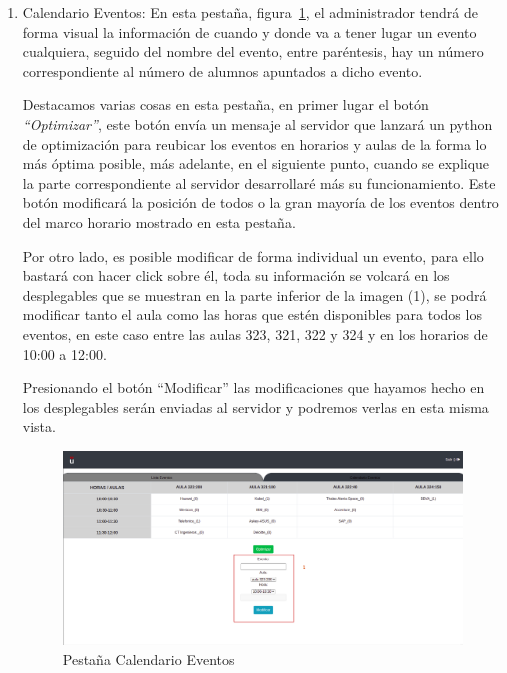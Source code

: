 \documentclass[a4paper, 12pt]{book}
\begin{document}
\begin{enumerate}
	\item Calendario Eventos: En esta pestaña, figura~\ref{fig:adminCalendario}, el administrador tendrá de forma visual la información de cuando y donde va a tener lugar un evento cualquiera, seguido del nombre del evento, entre paréntesis, hay un número correspondiente al número de alumnos apuntados a dicho evento.
	
	Destacamos varias cosas en esta pestaña, en primer lugar el botón \textit{``Optimizar''}, este botón envía un mensaje al servidor que lanzará un python de optimización para reubicar los eventos en horarios y aulas de la forma lo más óptima posible, más adelante, en el siguiente punto, cuando se explique la parte correspondiente al servidor desarrollaré más su funcionamiento. Este botón modificará la posición de todos o la gran mayoría de los eventos dentro del marco horario mostrado en esta pestaña.
	
	Por otro lado, es posible modificar de forma individual un evento, para ello bastará con hacer click sobre él, toda su información se volcará en los desplegables que se muestran en la parte inferior de la imagen (1), se podrá modificar tanto el aula como las horas que estén disponibles para todos los eventos, en este caso entre las aulas 323, 321, 322 y 324 y en los horarios de 10:00 a 12:00. 
	
	Presionando el botón ``Modificar'' las modificaciones que hayamos hecho en los desplegables serán enviadas al servidor y podremos verlas en esta misma vista.
	
		\begin{figure}
  	\centering
  	\includegraphics[width=16cm, keepaspectratio]{img/adminCalendario.png}
  	\caption{Pestaña Calendario Eventos}\label{fig:adminCalendario}
	\end{figure}
  
\end{enumerate}
\end{document}
